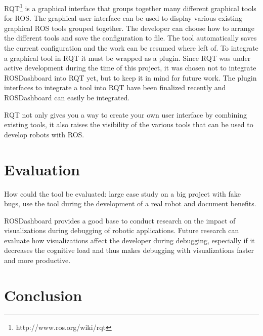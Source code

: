 RQT\footnote{http://www.ros.org/wiki/rqt} is a graphical interface that groups together many different graphical tools for ROS. The graphical user interface can be used to display various existing graphical ROS tools grouped together. The developer can choose how to arrange the different tools and save the configuration to file. The tool automatically saves the current configuration and the work can be resumed where left of. To integrate a graphical tool in RQT it must be wrapped as a plugin.
Since RQT was under active development during the time of this project, it was chosen not to integrate ROSDashboard into RQT yet, but to keep it in mind for future work. The plugin interfaces to integrate a tool into RQT have been finalized recently  and ROSDashboard can easily be integrated.

RQT not only gives you a way to create your own user interface by combining existing tools, it also raises the visibility of the various tools that can be used to develop robots with ROS.

\section{Evaluation}
How could the tool be evaluated: large case study on a big project with fake bugs, use the tool during the development of a real robot and document benefits.

 ROSDashboard provides a good base to conduct research on the impact of visualizations during debugging of robotic applications. Future research can evaluate how visualizations affect the developer during debugging, especially if it decreases the cognitive load and thus makes debugging with visualizations faster and more productive.

\section{Conclusion}


